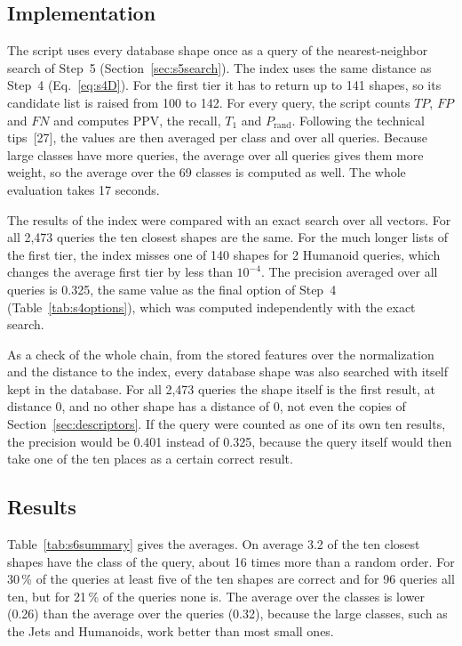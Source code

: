 \documentclass[10pt,a4paper]{article}
\begin{document}
\subsection{Implementation}\label{sec:s6impl}
The script  uses every database shape once as a query of the nearest-neighbor search of Step~5
(Section~\ref{sec:s5search}). The index uses the same distance as Step~4 (Eq.~\eqref{eq:s4D}). For the first tier it has to
return up to 141 shapes, so its candidate list is raised from 100 to 142. For every query, the script counts $TP$, $FP$ and $FN$
and computes $\mathrm{PPV}$, the recall, $T_1$ and $P_{\mathrm{rand}}$. Following the technical tips~[27], the values are then
averaged per class and over all queries. Because large classes have more queries, the average over all queries gives them more
weight, so the average over the 69 classes is computed as well. The whole evaluation takes 17 seconds.

The results of the index were compared with an exact search over all vectors. For all 2,473 queries the ten closest shapes are
the same. For the much longer lists of the first tier, the index misses one of 140 shapes for 2 Humanoid queries, which changes
the average first tier by less than $10^{-4}$. The precision averaged over all queries is 0.325, the same value as the final option
of Step~4 (Table~\ref{tab:s4options}), which was computed independently with the exact search.

As a check of the whole chain, from the stored features over the normalization and the distance to the index, every database
shape was also searched with itself kept in the database. For all 2,473 queries the shape itself is the first result, at
distance 0, and no other shape has a distance of 0, not even the copies of Section~\ref{sec:descriptors}. If the query were
counted as one of its own ten results, the precision would be 0.401 instead of 0.325, because the query itself would then take
one of the ten places as a certain correct result.

\subsection{Results}
Table~\ref{tab:s6summary} gives the averages. On average 3.2 of the ten closest shapes have the class of the query, about 16 times
more than a random order. For 30\,\% of the queries at least five of the ten shapes are correct and for 96 queries all ten, but
for 21\,\% of the queries none is. The average over the classes is lower (0.26) than the average over the queries (0.32), because
the large classes, such as the Jets and Humanoids, work better than most small ones.
\end{document}

